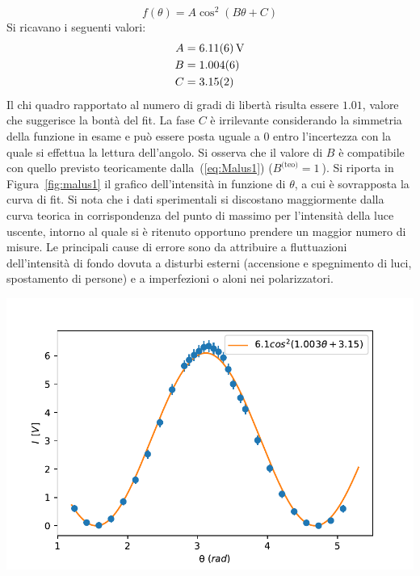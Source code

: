 \documentclass[10pt,oneside,a4paper]{article}
\newenvironment{Figure}
  {\par\medskip\noindent\minipage{\linewidth}}
  {\endminipage\par\medskip}
\begin{document}
\begin{multicols}{2}
\[
f(\theta) = A\cos^2(B\theta + C)
\]
Si ricavano i seguenti valori:
\[
\begin{aligned}
A &= \SI{6.11 \pm 0.06}{V} \\
B &= \SI{1.004 \pm 0.006}{} \\
C &= \SI{3.15 \pm 0.02}{}
\end{aligned}
\]
Il chi quadro rapportato al numero di gradi di libertà risulta essere $1.01$, valore che suggerisce la bontà del fit. La fase $C$ è irrilevante considerando la simmetria della funzione in esame e può essere posta uguale a $0$ entro l'incertezza con la quale si effettua la lettura dell'angolo. Si osserva che il valore di $B$ è compatibile con quello previsto teoricamente dalla~(\ref{eq:Malus1}) ($B^{\text{(teo)}} = \SI{1}{}$).
Si riporta in Figura~\ref{fig:malus1} il grafico dell'intensità in funzione di $\theta$, a cui è sovrapposta la curva di fit. Si nota che i dati sperimentali si discostano maggiormente dalla curva teorica in corrispondenza del punto di massimo per l'intensità della luce uscente, intorno al quale si è ritenuto opportuno prendere un maggior numero di misure.
Le principali cause di errore sono da attribuire a fluttuazioni dell'intensità di fondo dovuta a disturbi esterni (accensione e spegnimento di luci, spostamento di persone) e a imperfezioni o aloni nei polarizzatori.


\begin{Figure}
	\begin{center}
	\includegraphics[width=\linewidth]{malus1.pdf}
	\label{fig:malus1}
	\end{center}
\end{Figure}


\end{multicols}
\end{document}
